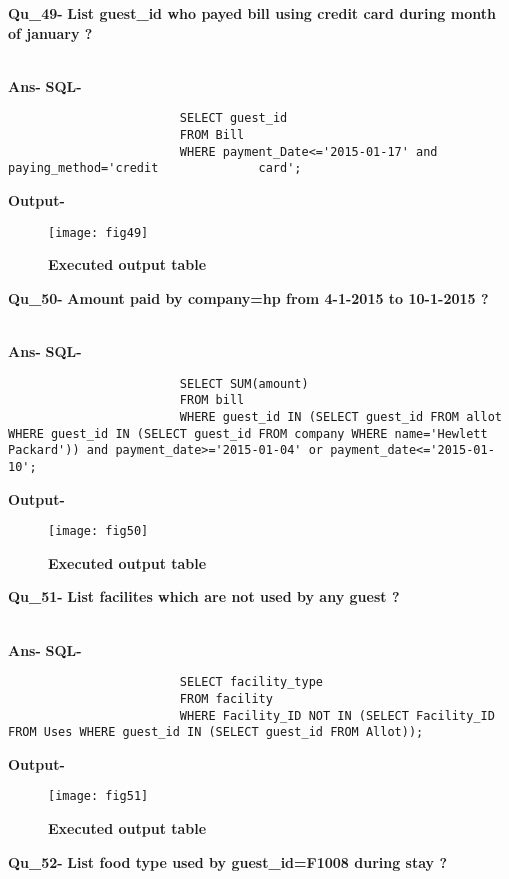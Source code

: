 \documentclass[a4,12pt]{report}
\begin{document}
\textbf{Qu\_49-}  \textbf{List guest\_id who payed bill using credit card during month of january ?} \\\

\textbf{Ans-}		\textbf{SQL-}
\begin{lstlisting}
						SELECT guest_id 
						FROM Bill 
						WHERE payment_Date<='2015-01-17' and paying_method='credit 				card';
\end{lstlisting}
\textbf{Output-} \\			   
\begin{figure}[hbtp]
\centering
\texttt{[image: fig49]}
\caption{\textbf{{\color{red}Executed output table}}}
\end{figure}

\newpage
\textbf{Qu\_50-}  \textbf{Amount paid by company=hp from 4-1-2015 to 10-1-2015 ?} \\\

\textbf{Ans-}		\textbf{SQL-}
\begin{lstlisting}
						SELECT SUM(amount) 
						FROM bill 
						WHERE guest_id IN (SELECT guest_id FROM allot WHERE guest_id IN (SELECT guest_id FROM company WHERE name='Hewlett Packard')) and payment_date>='2015-01-04' or payment_date<='2015-01-10'; 
\end{lstlisting}
\textbf{Output-} \\			   
\begin{figure}[hbtp]
\centering
\texttt{[image: fig50]}
\caption{\textbf{{\color{red}Executed output table}}}
\end{figure}

\textbf{Qu\_51-}  \textbf{List facilites which are not used by any guest  ?} \\\

\textbf{Ans-}		\textbf{SQL-}
\begin{lstlisting}
						SELECT facility_type 
						FROM facility 
						WHERE Facility_ID NOT IN (SELECT Facility_ID FROM Uses WHERE guest_id IN (SELECT guest_id FROM Allot)); 
\end{lstlisting}
\textbf{Output-} \\			   
\begin{figure}[hbtp]
\centering
\texttt{[image: fig51]}
\caption{\textbf{{\color{red}Executed output table}}}
\end{figure}


\textbf{Qu\_52-}  \textbf{List food type used by guest\_id=F1008 during stay ?} \\\
\end{document}

